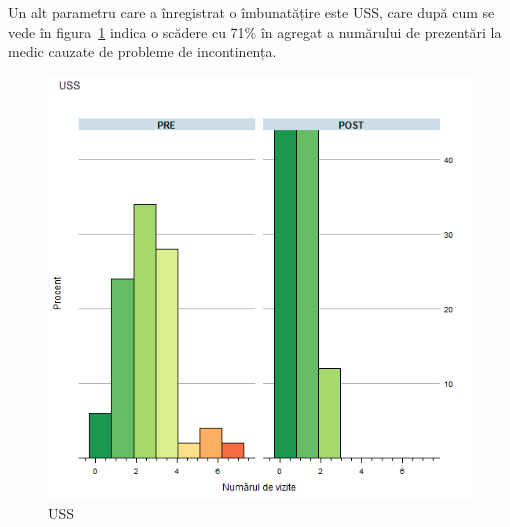 \documentclass[12pt]{article}
\begin{document}
  Un alt parametru care a înregistrat o îmbunatățire este \acf{USS}, care după cum se vede în figura~\ref{fig:incoResUSS} indica o scădere cu 71\% în agregat a numărului de prezentări la medic cauzate de probleme de incontinența.
  \begin{figure}[H]
    \centering
    \includegraphics[width=0.8\linewidth]{incoResUSS}
    \caption{\acf{USS}}
    \label{fig:incoResUSS}
  \end{figure}
  
\end{document}
